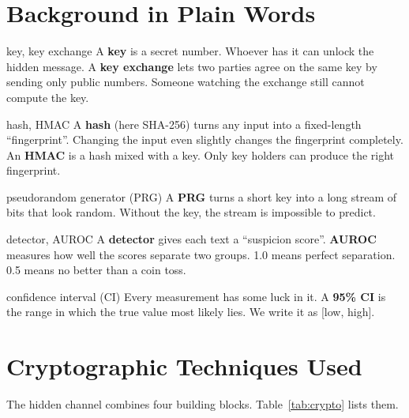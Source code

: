 \documentclass[11pt,a4paper]{article}
\begin{document}
\section{Background in Plain Words}
\begin{plain}{key, key exchange}
A \textbf{key} is a secret number. Whoever has it can unlock the hidden message.
A \textbf{key exchange} lets two parties agree on the same key by sending only public numbers.
Someone watching the exchange still cannot compute the key.
\end{plain}

\begin{plain}{hash, HMAC}
A \textbf{hash} (here SHA-256) turns any input into a fixed-length ``fingerprint''.
Changing the input even slightly changes the fingerprint completely.
An \textbf{HMAC} is a hash mixed with a key. Only key holders can produce the right fingerprint.
\end{plain}

\begin{plain}{pseudorandom generator (PRG)}
A \textbf{PRG} turns a short key into a long stream of bits that look random.
Without the key, the stream is impossible to predict.
\end{plain}

\begin{plain}{detector, AUROC}
A \textbf{detector} gives each text a ``suspicion score''.
\textbf{AUROC} measures how well the scores separate two groups.
1.0 means perfect separation. 0.5 means no better than a coin toss.
\end{plain}

\begin{plain}{confidence interval (CI)}
Every measurement has some luck in it. A \textbf{95\% CI} is the range in which the true value most likely lies.
We write it as [low, high].
\end{plain}

\section{Cryptographic Techniques Used}
The hidden channel combines four building blocks. Table~\ref{tab:crypto} lists them.
\end{document}
